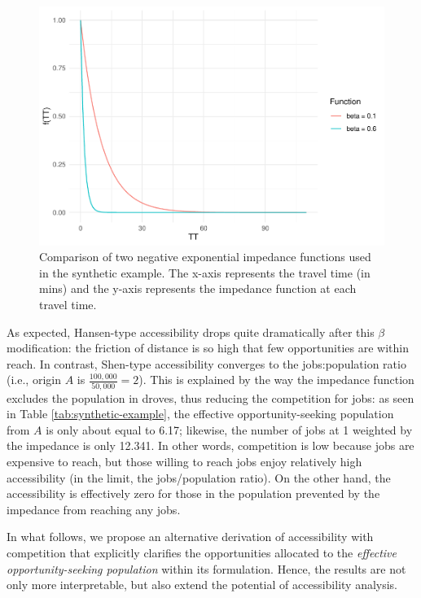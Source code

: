 \documentclass[]{elsarticle} %
\begin{document}
\begin{figure}
\includegraphics[width=1\linewidth]{Spatial-Availability-Refreshed_files/figure-latex/comparison-impedance-functions-synthetic-example-1} \caption{\label{fig:impedance-functions-comparison}Comparison of two negative exponential impedance functions used in the synthetic example. The x-axis represents the travel time (in mins) and the y-axis represents the impedance function at each travel time.}\label{fig:comparison-impedance-functions-synthetic-example}
\end{figure}

As expected, Hansen-type accessibility drops quite dramatically after
this \(\beta\) modification: the friction of distance is so high that
few opportunities are within reach. In contrast, Shen-type accessibility
converges to the jobs:population ratio (i.e., origin \(A\) is
\(\frac{100,000}{50,000} = 2\)). This is explained by the way the
impedance function excludes the population in droves, thus reducing the
competition for jobs: as seen in Table \ref{tab:synthetic-example}, the
effective opportunity-seeking population from \(A\) is only about equal
to 6.17; likewise, the number of jobs at 1 weighted by the impedance is
only 12.341. In other words, competition is low because jobs are
expensive to reach, but those willing to reach jobs enjoy relatively
high accessibility (in the limit, the jobs/population ratio). On the
other hand, the accessibility is effectively zero for those in the
population prevented by the impedance from reaching any jobs.

In what follows, we propose an alternative derivation of
\citet{shen1998} accessibility with competition that explicitly
clarifies the opportunities allocated to the \emph{effective
opportunity-seeking population} within its formulation. Hence, the
results are not only more interpretable, but also extend the potential
of accessibility analysis.
\end{document}
